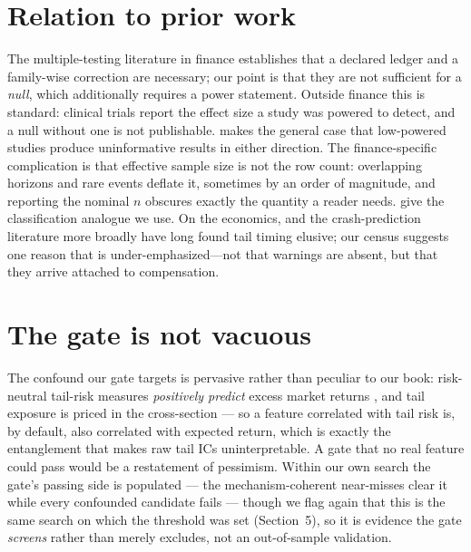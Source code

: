 \documentclass[11pt]{article}
\begin{document}
\section{Relation to prior work}
The multiple-testing literature in finance \citep{hl, hlz} establishes that a declared ledger
and a family-wise correction are necessary; our point is that they are not sufficient for a
\emph{null}, which additionally requires a power statement. Outside finance this is standard:
clinical trials report the effect size a study was powered to detect, and a null without one is
not publishable. \citet{ioan} makes the general case that low-powered studies produce
uninformative results in either direction. The finance-specific complication is that effective
sample size is not the row count: overlapping horizons and rare events deflate it, sometimes by
an order of magnitude, and reporting the nominal $n$ obscures exactly the quantity a reader
needs. \citet{hm} give the classification analogue we use. On the economics, \citet{bp} and the
crash-prediction literature more broadly have long found tail timing elusive; our census
suggests one reason that is under-emphasized---not that warnings are absent, but that they
arrive attached to compensation.

\section{The gate is not vacuous}
The confound our gate targets is pervasive rather than peculiar to our book: risk-neutral
tail-risk measures \emph{positively predict} excess market returns \citep{bt}, and tail
exposure is priced in the cross-section \citep{kj} --- so a feature correlated with tail risk
is, by default, also correlated with expected return, which is exactly the entanglement that
makes raw tail ICs uninterpretable. A gate that no real feature could pass would be a
restatement of pessimism. Within our own search the gate's passing side is populated --- the
mechanism-coherent near-misses clear it while every confounded candidate fails --- though we
flag again that this is the same search on which the threshold was set (Section~5), so it is
evidence the gate \emph{screens} rather than merely excludes, not an out-of-sample validation.
\end{document}
